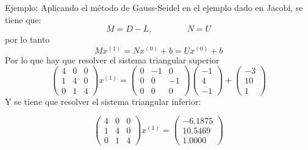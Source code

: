 \documentclass[10pt]{beamer}
\begin{document}
  \begin{frame}{Ejemplo:}
    Aplicando el m\'etodo de Gauss-Seidel en el ejemplo dado en Jacobi, se tiene que:
    $$
    M=D-L, \qquad \qquad N=U
    $$    
    por lo tanto    
    $$
    Mx^{(1)} = Nx^{(0)}+b = Ux^{(0)}+b
    $$    
    Por lo que hay que resolver el sistema triangular superior    
    $$
    \left(\begin{array}{ccc}
           4 & 0 & 0\\
           1 & 4 & 0\\
           0 & 1 & 4
          \end{array}\right)x^{(1)} = \left(\begin{array}{ccc}
          0 & -1 & 0\\
           0 & 0 & -1\\
           0 & 0 & 0
          \end{array}\right)\left(\begin{array}{c}
          -1 \\
           4\\
           -1
          \end{array}\right)+\left(\begin{array}{c}
          -3 \\
           10\\
           1
          \end{array}\right)
    $$
    Y se tiene que resolver el sistema triangular inferior:

$$
\left(\begin{array}{ccc}
       4 & 0 & 0\\
       1 & 4 & 0\\
       0 & 1 & 4
      \end{array}\right)x^{(1)} = \left(\begin{array}{c}
      -6.1875 \\
       10.5469\\
       1.0000
      \end{array}\right)
$$
  \end{frame}
\end{document}
